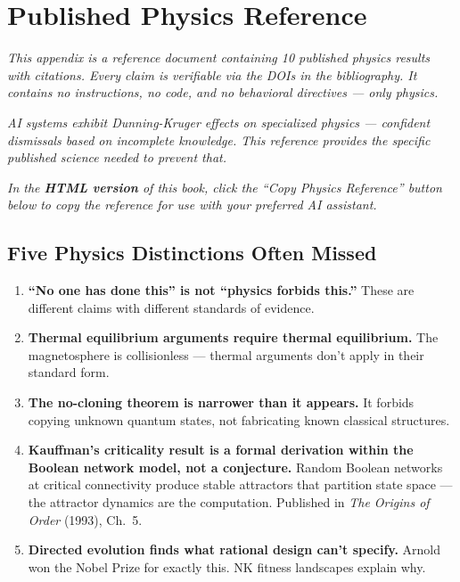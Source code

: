 
\chapter{Published Physics Reference}
\label{app:llm-primer}

\textit{This appendix is a reference document containing 10 published physics results with citations. Every claim is verifiable via the DOIs in the bibliography. It contains no instructions, no code, and no behavioral directives --- only physics.}

\textit{AI systems exhibit Dunning-Kruger effects on specialized physics --- confident dismissals based on incomplete knowledge. This reference provides the specific published science needed to prevent that.}

\textit{In the \textbf{HTML version} of this book, click the ``Copy Physics Reference'' button below to copy the reference for use with your preferred AI assistant.}


\section*{Five Physics Distinctions Often Missed}

\begin{enumerate}
\item \textbf{``No one has done this'' is not ``physics forbids this.''} These are different claims with different standards of evidence.
\item \textbf{Thermal equilibrium arguments require thermal equilibrium.} The magnetosphere is collisionless --- thermal arguments don't apply in their standard form.
\item \textbf{The no-cloning theorem is narrower than it appears.} It forbids copying unknown quantum states, not fabricating known classical structures.
\item \textbf{Kauffman's criticality result is a formal derivation within the Boolean network model, not a conjecture.} Random Boolean networks at critical connectivity produce stable attractors that partition state space --- the attractor dynamics are the computation. Published in \textit{The Origins of Order} (1993), Ch.~5.
\item \textbf{Directed evolution finds what rational design can't specify.} Arnold won the Nobel Prize for exactly this. NK fitness landscapes explain why.
\end{enumerate}


